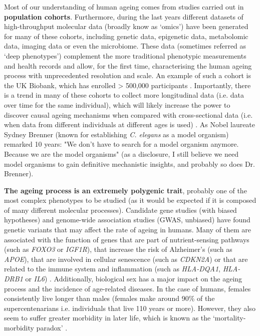 \bigskip

Most of our understanding of human ageing comes from studies carried out in \textbf{population cohorts}. Furthermore, during the last years different datasets of high-throughput molecular data (broadly know as `omics') have been generated for many of these cohorts, including genetic data, epigenetic data, metabolomic data, imaging data or even the microbiome. These data (sometimes referred as `deep phenotypes') complement the more traditional phenotypic measurements and health records and allow, for the first time, characterising the human ageing process with unprecedented resolution and scale. An example of such a cohort is the UK Biobank, which has enrolled > 500,000 participants \cite{Bahcall2018}. Importantly, there is a trend in many of these cohorts to collect more longitudinal data (i.e. data over time for the same individual), which will likely increase the power to discover causal ageing mechanisms when compared with cross-sectional data (i.e. when data from different individuals at different ages is used) \cite{Rahmadi2017}. As Nobel laureate Sydney Brenner (known for establishing \textit{C. elegans} as a model organism) remarked 10 years: "We don't have to search for a model organism anymore. Because we are the model organisms" \cite{FitzGerald2018} (as a disclosure, I still believe we need model organisms to gain definitive mechanistic insights, and probably so does Dr. Brenner). 

\bigskip

\textbf{The ageing process is an extremely polygenic trait}, probably one of the most complex phenotypes to be studied (as it would be expected if it is composed of many different molecular processes). Candidate gene studies (with biased hypotheses) and genome-wide association studies (\acrshort{GWAS}, unbiased) have found genetic variants that may affect the rate of ageing in humans. Many of them are associated with the function of genes that are part of nutrient-sensing pathways (such as \textit{FOXO3} or \textit{IGF1R}), that increase the risk of Alzheimer's (such as \textit{APOE}), that are involved in cellular senescence (such as \textit{CDKN2A}) or that are related to the immune system and inflammation (such as \textit{HLA-DQA1}, \textit{HLA-DRB1} or \textit{IL6}) \cite{Singh2019,Partridge2018}. Additionally, biological sex has a major impact on the ageing process and the incidence of age-related diseases. In the case of humans, females consistently live longer than males (females make around 90\% of the supercentenarians i.e. individuals that live 110 years or more). However, they also seem to suffer greater morbidity in later life, which is known as the `mortality-morbidity paradox' \cite{Austad2016}.

